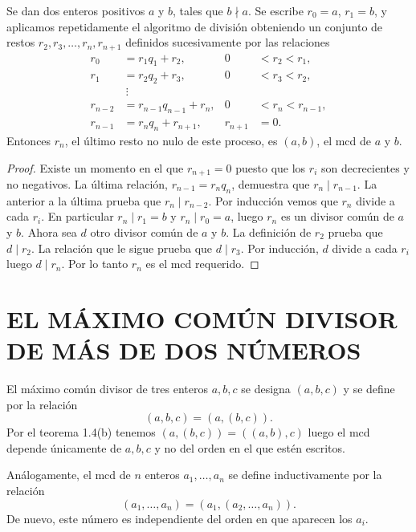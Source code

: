 \documentclass[12pt,a4paper]{book}
\begin{document}
    \begin{teorema}
        Se dan dos enteros positivos $a$ y $b$, tales que $b\nmid a$. Se escribe $r_0=a$,
        $r_1=b$, y aplicamos repetidamente el algoritmo de división obteniendo un conjunto de
        restos $r_2,r_3,\dots,r_n,r_{n+1}$ definidos sucesivamente por las relaciones
        \begin{align*}
            r_0&=r_1q_1+r_2, & 0&<r_2<r_1,\\
            r_1&=r_2q_2+r_3, & 0&<r_3<r_2,\\
            &\ \vdots & &\\
            r_{n-2}&=r_{n-1}q_{n-1}+r_n, & 0&<r_n<r_{n-1},\\
            r_{n-1}&=r_nq_n+r_{n+1}, & r_{n+1}&=0.
        \end{align*}
        Entonces $r_n$, el último resto no nulo de este proceso, es $(a,b)$, el mcd de $a$ y
        $b$.
    \end{teorema}

    \begin{proof}
        Existe un momento en el que $r_{n+1}=0$ puesto que los $r_i$ son decrecientes y no
        negativos. La última relación, $r_{n-1}=r_nq_n$, demuestra que $r_n\mid r_{n-1}$. La
        anterior a la última prueba que $r_n\mid r_{n-2}$. Por inducción vemos que $r_n$
        divide a cada $r_i$. En particular $r_n\mid r_1=b$ y $r_n\mid r_0=a$, luego $r_n$ es
        un divisor común de $a$ y $b$. Ahora sea $d$ otro divisor común de $a$ y $b$. La
        definición de $r_2$ prueba que $d\mid r_2$. La relación que le sigue prueba que
        $d\mid r_3$. Por inducción, $d$ divide a cada $r_i$ luego $d\mid r_n$. Por lo tanto
        $r_n$ es el mcd requerido.
    \end{proof}

    \section{EL MÁXIMO COMÚN DIVISOR DE MÁS DE DOS NÚMEROS}

    El máximo común divisor de tres enteros $a,b,c$ se designa $(a,b,c)$ y se define por la
    relación
    \begin{equation*}
        (a,b,c)=(a,(b,c)).
    \end{equation*}
    Por el teorema 1.4(b) tenemos $(a,(b,c))=((a,b),c)$ luego el mcd depende únicamente de
    $a,b,c$ y no del orden en el que estén escritos.

    Análogamente, el mcd de $n$ enteros $a_1,\dots,a_n$ se define inductivamente por la
    relación
    \begin{equation*}
        (a_1,\dots,a_n)=(a_1,(a_2,\dots,a_n)).
    \end{equation*}
    De nuevo, este número es independiente del orden en que aparecen los $a_i$.
\end{document}
